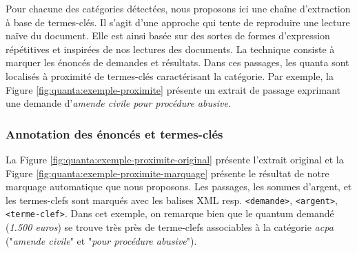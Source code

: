 Pour chacune des catégories détectées, nous proposons ici une chaîne d'extraction à base de termes-clés. Il s'agit d'une approche qui tente de reproduire une lecture naïve du document. Elle est ainsi basée sur des sortes de formes d'expression répétitives et inspirées de nos lectures des documents. La technique consiste à marquer les énoncés de demandes et résultats. Dans ces passages, les quanta sont localisés à proximité de termes-clés caractérisant la catégorie. Par exemple, la Figure \ref{fig:quanta:exemple-proximite} présente un extrait de passage exprimant une demande d'\textit{amende civile pour procédure abusive}.

\subsubsection{Annotation des énoncés et termes-clés}

 La Figure \ref{fig:quanta:exemple-proximite-original} présente l'extrait original et la Figure \ref{fig:quanta:exemple-proximite-marquage} présente le résultat de notre marquage automatique que nous proposons. Les passages, les sommes d'argent, et les termes-clefs sont marqués avec les balises XML resp. \verb=<demande>=, \verb=<argent>=, \verb=<terme-clef>=. Dans cet exemple, on remarque bien que le quantum demandé (\textit{1.500 euros}) se trouve très près de terme-clefs associables à la catégorie \textit{acpa} ("\textit{amende civile}" et "\textit{pour procédure abusive}"). 


